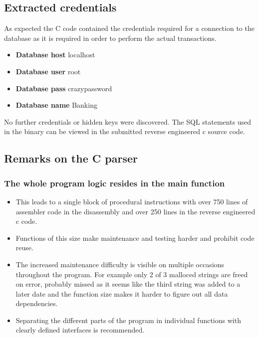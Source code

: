 \subsection{Extracted credentials}
As expected the C code contained the credentials required for a connection to
the database as it is required in order to perform the actual transactions.
\begin{itemize}
	\item \textbf{Database host} localhost
	\item \textbf{Database user} root
	\item \textbf{Database pass} crazypassword
	\item \textbf{Database name} Banking
\end{itemize}
No further credentials or hidden keys were discovered. The SQL statements used
in the binary can be viewed in the submitted reverse engineered c source code.

\subsection{Remarks on the C parser}
\subsubsection*{The whole program logic resides in the main function}
\begin{itemize}
	\item This leads to a single block of procedural instructions with
		over 750 lines of assembler code in the disassembly and over 250
		lines in the reverse engineered c code.
	\item Functions of this size make maintenance and testing harder
		and prohibit code reuse.
	\item The increased maintenance difficulty is visible on multiple
		occasions throughout the program. For example only 2 of 3
		malloced strings are freed on error, probably missed as it seems
		like the third string was added to a later date and the
		function size makes it harder to figure out all data
		dependencies.
	\item Separating the different parts of the program in individual
		functions with clearly defined interfaces is recommended.
\end{itemize}

